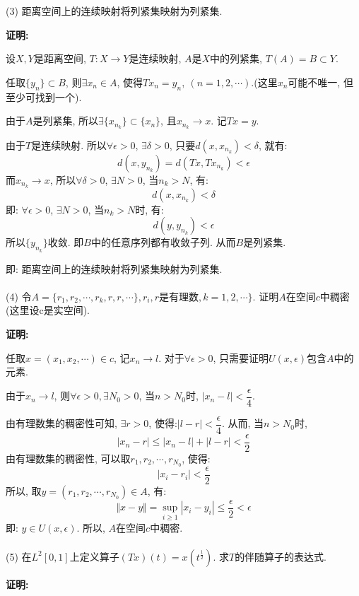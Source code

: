\documentclass{article}
\begin{document}
(3) 距离空间上的连续映射将列紧集映射为列紧集. 

\textbf{证明:}

设$X,Y$是距离空间, $T: X \rightarrow Y$是连续映射, $A$是$X$中的列紧集, $T(A) = B \subset Y$.

任取$ \{y_n\} \subset B$, 则$\exists x_n \in A$, 使得$Tx_n = y_n, \ (n=1, 2, \cdots)$.(这里$x_n$可能不唯一, 但至少可找到一个).

由于$A$是列紧集, 所以$\exists \{ x_{n_k} \} \subset \{x_n \}$, 且$x_{n_k} \rightarrow x$. 记$Tx = y$.

由于$T$是连续映射. 所以$\forall \epsilon >0$, $\exists \delta >0$, 只要$d(x, x_{n_k}) < \delta$, 就有:
$$ d(x, y_{n_k}) = d(Tx, Tx_{n_k}) < \epsilon  $$
而$x_{n_k} \rightarrow x$, 所以$\forall \delta >0$, $\exists N>0$, 当$n_k > N$, 有:
$$ d(x, x_{n_k}) < \delta $$
即: $\forall \epsilon >0$, $\exists N>0$, 当$n_k>N$时, 有:
$$ d(y, y_{n_k}) < \epsilon $$
所以$\{ y_{n_k} \}$收敛. 即$B$中的任意序列都有收敛子列. 从而$B$是列紧集.

即: 距离空间上的连续映射将列紧集映射为列紧集.  \\  \\


(4) 令$A = \{ r_1, r_2, \cdots, r_k, r, r, \cdots \}, r_i, r\text{是有理数}, k=1,2, \cdots \}$. 证明$A$在空间$c$中稠密(这里设c是实空间). 

\textbf{证明:}

任取$ x = (x_1, x_2, \cdots) \in c$, 记$x_n \rightarrow l$. 对于$\forall \epsilon >0$, 只需要证明$U(x, \epsilon)$包含$A$中的元素. 

由于$x_n \rightarrow l$, 则$\forall \epsilon >0, \exists N_0>0$, 当$n > N_0$时, $|x_n - l| < \dfrac{\epsilon}{4}$.

由有理数集的稠密性可知, $\exists r >0$, 使得:$|l-r| < \dfrac{\epsilon}{4}$. 从而, 当$n > N_0$时,
$$ |x_n - r| \leq |x_n-l| + |l-r| < \dfrac{\epsilon}{2} $$
由有理数集的稠密性, 可以取$r_1, r_2, \cdots, r_{N_0}$, 使得:
$$ |x_i - r_i| < \dfrac{\epsilon}{2} $$
所以, 取$y = (r_1, r_2, \cdots, r_{N_0}) \in A$, 有:
$$ \Vert x-y  \Vert = \sup\limits_{i \geq 1} |x_i - y_i| \leq \dfrac{\epsilon}{2} < \epsilon$$
即: $y \in U(x, \epsilon)$. 所以, $A$在空间$c$中稠密. \\  \\

(5) 在$L^2[0,1]$上定义算子$(Tx)(t) = x(t^{\frac{1}{2}})$. 求$T$的伴随算子的表达式. 

\textbf{证明:}
\end{document}
